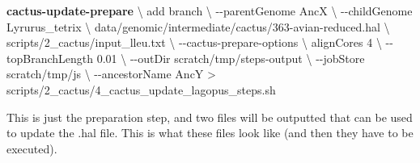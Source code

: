 \documentclass[
  letterpaper,
  DIV=11,
  numbers=noendperiod]{scrreprt}
\newenvironment{Shaded}{}{}
\newcommand{\AttributeTok}[1]{\textcolor[rgb]{0.84,0.23,0.29}{#1}}
\newcommand{\DataTypeTok}[1]{\textcolor[rgb]{0.84,0.23,0.29}{#1}}
\newcommand{\ExtensionTok}[1]{\textcolor[rgb]{0.84,0.23,0.29}{\textbf{#1}}}
\newcommand{\NormalTok}[1]{\textcolor[rgb]{0.14,0.16,0.18}{#1}}
\newcommand{\OperatorTok}[1]{\textcolor[rgb]{0.14,0.16,0.18}{#1}}
\newcommand{\StringTok}[1]{\textcolor[rgb]{0.01,0.18,0.38}{#1}}
\begin{document}
\begin{Shaded}
\begin{Highlighting}[]
\ExtensionTok{cactus{-}update{-}prepare} \DataTypeTok{\textbackslash{}}
\NormalTok{  add branch }\DataTypeTok{\textbackslash{}}
  \AttributeTok{{-}{-}parentGenome}\NormalTok{ AncX }\DataTypeTok{\textbackslash{}}
  \AttributeTok{{-}{-}childGenome}\NormalTok{ Lyrurus\_tetrix }\DataTypeTok{\textbackslash{}}
\NormalTok{  data/genomic/intermediate/cactus/363{-}avian{-}reduced.hal }\DataTypeTok{\textbackslash{}}
\NormalTok{  scripts/2\_cactus/input\_lleu.txt }\DataTypeTok{\textbackslash{}}
  \AttributeTok{{-}{-}cactus{-}prepare{-}options} \DataTypeTok{\textbackslash{}}
  \StringTok{\textquotesingle{}{-}{-}alignCores 4\textquotesingle{}} \DataTypeTok{\textbackslash{}}
  \AttributeTok{{-}{-}topBranchLength}\NormalTok{ 0.01 }\DataTypeTok{\textbackslash{}}
  \AttributeTok{{-}{-}outDir}\NormalTok{ scratch/tmp/steps{-}output }\DataTypeTok{\textbackslash{}}
  \AttributeTok{{-}{-}jobStore}\NormalTok{ scratch/tmp/js }\DataTypeTok{\textbackslash{}}
  \AttributeTok{{-}{-}ancestorName}\NormalTok{ AncY }\OperatorTok{\textgreater{}}\NormalTok{ scripts/2\_cactus/4\_cactus\_update\_lagopus\_steps.sh }
  
\end{Highlighting}
\end{Shaded}

This is just the preparation step, and two files will be outputted that
can be used to update the .hal file. This is what these files look like
(and then they have to be executed).
\end{document}
